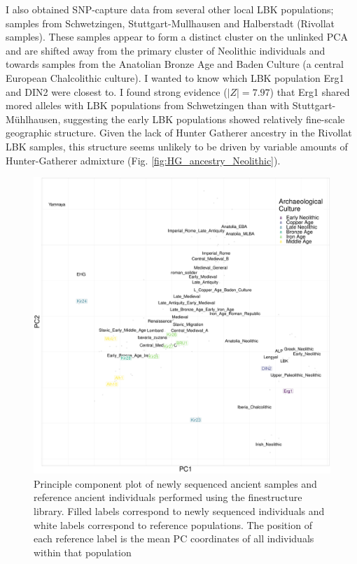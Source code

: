I also obtained SNP-capture data from several other local LBK populations; samples from Schwetzingen, Stuttgart-Mullhausen and Halberstadt (Rivollat samples). These samples appear to form a distinct cluster on the unlinked PCA and are shifted away from the primary cluster of Neolithic individuals and towards samples from the Anatolian Bronze Age and Baden Culture (a central European Chalcolithic culture). I wanted to know which LBK population Erg1 and DIN2 were closest to. I found strong evidence ($|Z| = 7.97$) that Erg1 shared mored alleles with LBK populations from Schwetzingen than with Stuttgart-Mühlhausen, suggesting the early LBK populations showed relatively fine-scale geographic structure. Given the lack of Hunter Gatherer ancestry in the Rivollat LBK samples, this structure seems unlikely to be driven by variable amounts of Hunter-Gatherer admixture (Fig. \ref{fig:HG_ancestry_Neolithic}).

\begin{figure}[htp]
    \centering
    \includegraphics[width=1.0\textwidth]{../images/chapter4/chromopainter_PCA.pdf}
    \caption{Principle component plot of newly sequenced ancient samples and reference ancient individuals performed using the finestructure library. Filled labels correspond to newly sequenced individuals and white labels correspond to reference populations. The position of each reference label is the mean PC coordinates of all individuals within that population}
    \label{fig:chapter4_results_finestructure pca}
\end{figure}

